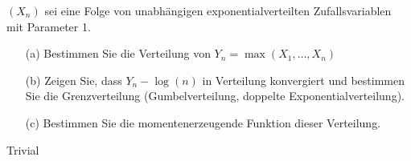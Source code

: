 \begin{exercise}
$(X_n)$ sei eine Folge von unabhängigen exponentialverteilten Zufallsvariablen
mit Parameter 1.
\begin{itemize}
  \item[(a)] Bestimmen Sie die Verteilung von $Y_n = \max(X_1,\dots,X_n)$
  \item[(b)] Zeigen Sie, dass $Y_n - \log(n)$ in Verteilung konvergiert und bestimmen
  Sie die Grenzverteilung (Gumbelverteilung, doppelte Exponentialverteilung).
  \item[(c)] Bestimmen Sie die momentenerzeugende Funktion dieser Verteilung.
\end{itemize}
\end{exercise}
\begin{solution}

Trivial

\end{solution}
